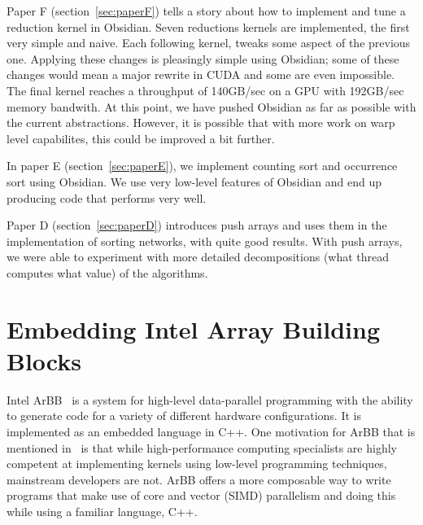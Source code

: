 \documentclass[a4paper]{book}
\begin{document}
Paper F (section~\ref{sec:paperF}) tells a story about how to implement and tune 
a reduction kernel in Obsidian. Seven reductions kernels are implemented, the first 
very simple and naive. Each following kernel, tweaks some aspect of the previous one. 
Applying these changes is pleasingly simple using Obsidian; some of these changes 
would mean a major rewrite in CUDA and some are even impossible. 
The final kernel reaches a throughput of 140GB/sec on a GPU with 192GB/sec memory bandwith. 
At this point, we have pushed Obsidian as far as possible with the current abstractions. 
However, it is possible that with more work on warp level capabilites, this could be 
improved a bit further.   

In paper E (section~\ref{sec:paperE}), we implement counting sort and occurrence sort 
using Obsidian. We use very low-level features of Obsidian and end up producing 
code that performs very well. 

Paper D (section~\ref{sec:paperD}) introduces push arrays and uses them in the 
implementation of sorting networks, with quite good results. With push arrays, we 
were able to experiment with more detailed decompositions (what thread computes 
what value) of the algorithms. 

\FloatBarrier 
%
%
\section{Embedding Intel Array Building Blocks} 

Intel ArBB~\citet{ARBB2011} is a system for high-level data-parallel programming with the 
ability to generate code for a variety of different hardware configurations. It is implemented 
as an embedded language in C++. One motivation for ArBB that is mentioned in~\citet{ARBB2011} is 
that while high-performance computing specialists are highly competent at implementing 
kernels using low-level programming techniques, mainstream developers are not. ArBB offers 
a more composable way to write programs that make use of core and vector (SIMD) parallelism and 
doing this while using a familiar language, C++.  
\end{document}
